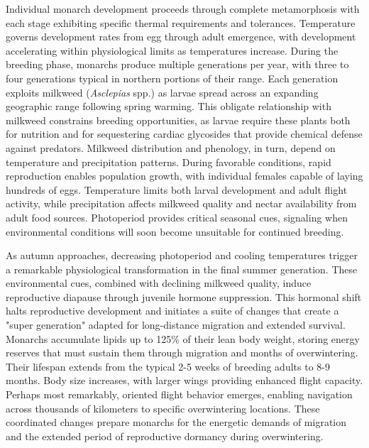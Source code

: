 Individual monarch development proceeds through complete metamorphosis with each stage exhibiting specific thermal requirements and tolerances. Temperature governs development rates from egg through adult emergence, with development accelerating within physiological limits as temperatures increase. During the breeding phase, monarchs produce multiple generations per year, with three to four generations typical in northern portions of their range. Each generation exploits milkweed (\textit{Asclepias} spp.) as larvae spread across an expanding geographic range following spring warming. This obligate relationship with milkweed constrains breeding opportunities, as larvae require these plants both for nutrition and for sequestering cardiac glycosides that provide chemical defense against predators. Milkweed distribution and phenology, in turn, depend on temperature and precipitation patterns. During favorable conditions, rapid reproduction enables population growth, with individual females capable of laying hundreds of eggs. Temperature limits both larval development and adult flight activity, while precipitation affects milkweed quality and nectar availability from adult food sources. Photoperiod provides critical seasonal cues, signaling when environmental conditions will soon become unsuitable for continued breeding.

As autumn approaches, decreasing photoperiod and cooling temperatures trigger a remarkable physiological transformation in the final summer generation. These environmental cues, combined with declining milkweed quality, induce reproductive diapause through juvenile hormone suppression. This hormonal shift halts reproductive development and initiates a suite of changes that create a "super generation" adapted for long-distance migration and extended survival. Monarchs accumulate lipids up to 125\% of their lean body weight, storing energy reserves that must sustain them through migration and months of overwintering. Their lifespan extends from the typical 2-5 weeks of breeding adults to 8-9 months. Body size increases, with larger wings providing enhanced flight capacity. Perhaps most remarkably, oriented flight behavior emerges, enabling navigation across thousands of kilometers to specific overwintering locations. These coordinated changes prepare monarchs for the energetic demands of migration and the extended period of reproductive dormancy during overwintering.

